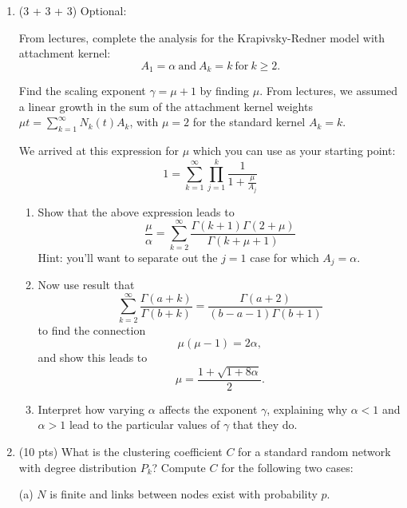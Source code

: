 \begin{enumerate}
  
   \solutionstart


   \solutionend


\item (3 + 3 + 3) Optional:

  From lectures, complete the analysis for the Krapivsky-Redner model
  with attachment kernel:
  $$
  A_{1} = \alpha 
  \
  \mbox{and} 
  \
  A_{k} = k
  \
  \mbox{for} 
  \
  k \ge 2.
  $$

  Find the scaling exponent $\gamma = \mu + 1$ by finding $\mu$.
  From lectures, we assumed a linear growth in the sum
  of the attachment kernel weights $\mu t = \sum_{k=1}^{\infty} N_{k}(t) A_{k}$,
  with $\mu=2$ for the standard kernel $A_{k}=k$.

  We arrived at this expression for $\mu$
  which you can use as your starting point:
  $$
  1 =
  \sum_{k=1}^{\infty} 
  \prod_{j=1}^{k}
  \frac{1}{1 + \frac{\mu}{A_{j}}}
  $$

  \begin{enumerate}
  \item
    Show that the above expression leads to 
    $$
    \frac{\mu}{\alpha}
    =
    \sum_{k=2}^{\infty} 
    \frac{\Gamma(k+1)\Gamma(2+\mu)}{\Gamma(k+\mu+1)}
    $$
    Hint: you'll want to separate out the $j=1$ case
    for which $A_{j}=\alpha$.
  \item
    Now use result that~\cite{krapivsky2001a}
    $$
    \sum_{k=2}^{\infty}
    \frac{\Gamma(a+k)}{\Gamma(b+k)}
    =
    \frac{\Gamma(a+2)}{(b-a-1)\Gamma(b+1)}
    $$
    to find the connection
    $$
    \mu(\mu-1) = 2\alpha,
    $$
    and show this leads to 
    $$
    \mu = \frac{1+\sqrt{1+8\alpha}}{2}.
    $$
  \item
    Interpret how varying $\alpha$ affects 
    the exponent $\gamma$, explaining why $\alpha<1$
    and $\alpha>1$ lead to the particular values
    of $\gamma$ that they do.
  \end{enumerate}

  
   \solutionstart


   \solutionend




\item (10 pts)
  What is the clustering coefficient $C$ for a standard random network
  with degree distribution $P_{k}$?  Compute $C$ for the following
  two cases:

  (a) $N$ is finite and links between nodes exist with probability $p$.


\end{enumerate}
